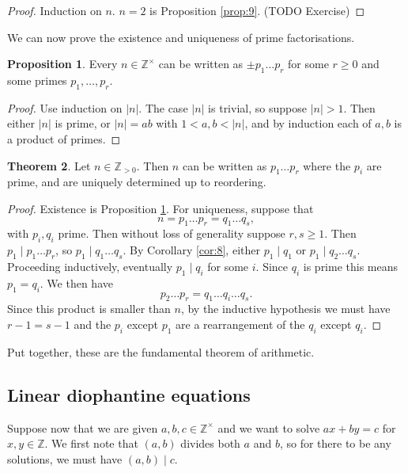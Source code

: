 \documentclass{article}
\newcommand{\Z}{\mathbb{Z}}
\newcommand{\rb}[1]{\left( #1 \right)}
\newcommand{\abs}[1]{\left\lvert #1 \right\rvert}
\theoremstyle{definition}\newtheorem{definition}{Definition}
\theoremstyle{definition}\newtheorem{remark}[definition]{Remark}
\theoremstyle{definition}\newtheorem*{example}{Example}
\theoremstyle{definition}\newtheorem*{note}{Note}
\newtheorem{proposition}[definition]{Proposition}
\newtheorem{theorem}[definition]{Theorem}
\begin{document}
\begin{proof}
Induction on $ n $. $ n = 2 $ is Proposition \ref{prop:9}. (TODO Exercise)
\end{proof}

We can now prove the existence and uniqueness of prime factorisations.

\begin{proposition}
\label{prop:11}
Every $ n \in \Z^\times $ can be written as $ \pm p_1 \dots p_r $ for some $ r \ge 0 $ and some primes $ p_1, \dots, p_r $.
\end{proposition}

\begin{proof}
Use induction on $ \abs{n} $. The case $ \abs{n} $ is trivial, so suppose $ \abs{n} > 1 $. Then either $ \abs{n} $ is prime, or $ \abs{n} = ab $ with $ 1 < a, b < \abs{n} $, and by induction each of $ a, b $ is a product of primes.
\end{proof}

\begin{theorem}
Let $ n \in \Z_{> 0} $. Then $ n $ can be written as $ p_1 \dots p_r $ where the $ p_i $ are prime, and are uniquely determined up to reordering.
\end{theorem}

\begin{proof}
Existence is Proposition \ref{prop:11}. For uniqueness, suppose that
$$ n = p_1 \dots p_r = q_1 \dots q_s, $$
with $ p_i, q_i $ prime. Then without loss of generality suppose $ r, s \ge 1 $. Then $ p_1 \mid p_1 \dots p_r $, so $ p_1 \mid q_1 \dots q_s $. By Corollary \ref{cor:8}, either $ p_1 \mid q_1 $ or $ p_1 \mid q_2 \dots q_s $. Proceeding inductively, eventually $ p_1 \mid q_i $ for some $ i $. Since $ q_i $ is prime this means $ p_1 = q_i $. We then have
$$ p_2 \dots p_r = q_1 \dots q_i \dots q_s. $$
Since this product is smaller than $ n $, by the inductive hypothesis we must have $ r - 1 = s - 1 $ and the $ p_i $ except $ p_1 $ are a rearrangement of the $ q_i $ except $ q_i $.
\end{proof}

Put together, these are the fundamental theorem of arithmetic.

\subsection{Linear diophantine equations}

Suppose now that we are given $ a, b, c \in \Z^\times $ and we want to solve $ ax + by = c $ for $ x, y \in \Z $. We first note that $ \rb{a, b} $ divides both $ a $ and $ b $, so for there to be any solutions, we must have $ \rb{a, b} \mid c $.
\end{document}
